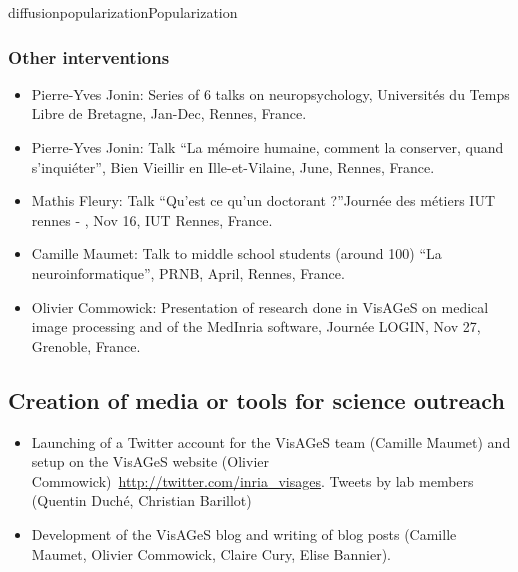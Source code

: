 \documentclass{ra2018}
\begin{document}
\begin{module}{diffusion}{popularization}{Popularization}
\subsubsection{Other interventions}
\begin{itemize}
    \item Pierre-Yves Jonin: Series of 6 talks on neuropsychology, Universités du Temps Libre de Bretagne, Jan-Dec, Rennes, France. 
    \item Pierre-Yves Jonin: Talk ``La mémoire humaine, comment la conserver, quand s’inquiéter'', Bien Vieillir en Ille-et-Vilaine, June, Rennes, France. 
    \item Mathis Fleury: Talk ``Qu'est ce qu'un doctorant ?''Journée des métiers IUT rennes - , Nov 16, IUT Rennes, France.
    \item Camille Maumet: Talk to middle school students  (around 100) ``La neuroinformatique'', PRNB, April, Rennes, France.
    \item Olivier Commowick: Presentation of research done in VisAGeS on medical image processing and of the MedInria software, Journée LOGIN, Nov 27, Grenoble, France. 
\end{itemize}

    

\subsection{Creation of media or tools for science outreach}
\begin{itemize}
    \item Launching of a Twitter account for the VisAGeS team (Camille Maumet) and setup on the VisAGeS website (Olivier Commowick)~\url{http://twitter.com/inria_visages}. Tweets by lab members (Quentin Duché, Christian Barillot)
    \item Development of the VisAGeS blog and writing of blog posts (Camille Maumet, Olivier Commowick, Claire Cury, Elise Bannier).
\end{itemize}


\end{module}
\end{document}
